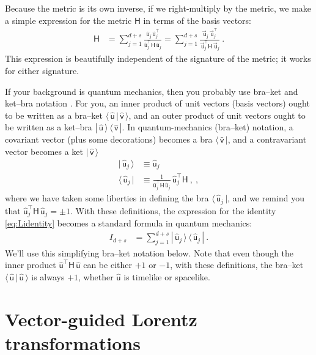 \documentclass{article}
\newcommand{\metric}{\mathsf{H}}
\newcommand\upvec[1]{\!\vec{\,\mathrm{#1}}}
\newcommand{\Lvec}[1]{\upvec{\mathsf{#1}}} %
\newcommand{\Lhat}[1]{\hat{\mathsf{#1}}} %
\newcommand{\bra}[1]{\langle\,{#1}\,|}
\newcommand{\ket}[1]{|\,{#1}\,\rangle}
\newcommand{\braket}[2]{\langle\,{#1}\,|\,{#2}\,\rangle}
\newcommand{\ketbra}[2]{|\,{#1}\,\rangle\,\langle\,{#2}\,|}
\begin{document}
Because the metric is its own inverse, if we right-multiply by the metric, we make a simple expression for the metric $\metric$ in terms of the basis vectors:
\begin{align}
    \metric &= \sum_{j=1}^{d+s} \frac{\Lhat{u}_j\,\Lhat{u}_j^\top}{\Lhat{u}_j^\top\metric\,\Lhat{u}_j} = \sum_{j=1}^{d+s} \frac{\Lvec{u}_j\,\Lvec{u}_j^\top}{\Lvec{u}_j^\top\metric\,\Lvec{u}_j} ~.
\end{align}
This expression is beautifully independent of the signature of the metric; it works for either signature.

If your background is quantum mechanics, then you probably use bra--ket and ket--bra notation \cite{dirac}.
For you, an inner product of unit vectors (basis vectors) ought to be written as a bra--ket $\braket{\Lhat{u}}{\Lhat{v}}$, and an outer product of unit vectors ought to be written as a ket--bra $\ketbra{\Lhat{u}}{\Lhat{v}}$.
In quantum-mechanics (bra--ket) notation, a covariant vector (plus some decorations) becomes a bra $\bra{\Lhat{v}}$, and a contravariant vector becomes a ket $\ket{\Lhat{v}}$
\begin{align}
    \ket{\Lhat{u}_j} &\equiv \Lhat{u}_j \label{eq:Lket}\\
    \bra{\Lhat{u}_j} &\equiv \frac{1}{\Lhat{u}_j^\top\metric\,\Lhat{u}_j}\,\Lhat{u}_j^\top\metric ~,\label{eq:Lbra} ~,
\end{align}
where we have taken some liberties in defining the bra $\bra{\Lhat{u}_j}$, and we remind you that $\Lhat{u}_j^\top\metric\,\Lhat{u}_j=\pm 1$.
With these definitions, the expression for the identity \eqref{eq:Lidentity} becomes a standard formula in quantum mechanics:
\begin{align}
    I_{d+s} &= \sum_{j=1}^{d+s} \ketbra{\Lhat{u}_j}{\Lhat{u}_j} \label{eq:LidentityQM} ~.
\end{align}
We'll use this simplifying bra--ket notation below.
Note that even though the inner product $\Lhat{u}^\top\metric\,\Lhat{u}$ can be either $+1$ or $-1$, with these definitions, the bra--ket $\braket{\Lhat{u}}{\Lhat{u}}$ is always $+1$, whether $\Lhat{u}$ is timelike or spacelike.

\section{Vector-guided Lorentz transformations}\label{sec:lt}
\end{document}
